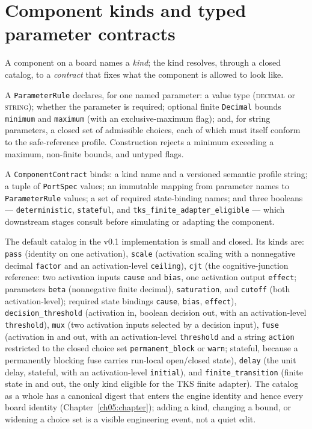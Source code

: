 \section{Component kinds and typed parameter contracts}
\label{ch04:sec:contracts}

A component on a board names a \emph{kind}; the kind resolves, through a
closed catalog, to a \emph{contract} that fixes what the component is
allowed to look like.

\begin{definition}\label{ch04:def:paramrule}
A \texttt{ParameterRule} declares, for one named parameter: a value type
(\textsc{decimal} or \textsc{string}); whether the parameter is required;
optional finite \texttt{Decimal} bounds \texttt{minimum} and
\texttt{maximum} (with an exclusive-maximum flag); and, for string
parameters, a closed set of admissible choices, each of which must itself
conform to the safe-reference profile. Construction rejects a minimum
exceeding a maximum, non-finite bounds, and untyped flags.
\end{definition}

\begin{definition}\label{ch04:def:contract}
A \texttt{ComponentContract} binds: a kind name and a versioned semantic
profile string; a tuple of \texttt{PortSpec} values; an immutable mapping
from parameter names to \texttt{ParameterRule} values; a set of required
state-binding names; and three booleans --- \texttt{deterministic},
\texttt{stateful}, and \texttt{tks\_finite\_adapter\_eligible} --- which
downstream stages consult before simulating or adapting the component.
\end{definition}

The default catalog in the v0.1 implementation is small and closed. Its
kinds are: \texttt{pass} (identity on one activation), \texttt{scale}
(activation scaling with a nonnegative decimal \texttt{factor} and an
activation-level \texttt{ceiling}), \texttt{cjt} (the cognitive-junction
reference: two activation inputs \texttt{cause} and \texttt{bias}, one
activation output \texttt{effect}; parameters \texttt{beta} (nonnegative
finite decimal), \texttt{saturation}, and \texttt{cutoff} (both
activation-level); required state bindings \texttt{cause},
\texttt{bias}, \texttt{effect}), \texttt{decision\_threshold}
(activation in, boolean decision out, with an activation-level
\texttt{threshold}), \texttt{mux} (two activation inputs selected by a
decision input), \texttt{fuse} (activation in and out, with an
activation-level \texttt{threshold} and a string \texttt{action}
restricted to the closed choice set \texttt{permanent\_block} or
\texttt{warn}; stateful, because a permanently blocking fuse carries
run-local open/closed state), \texttt{delay} (the unit delay, stateful,
with an activation-level \texttt{initial}), and \texttt{finite\_transition}
(finite state in and out, the only kind eligible for the TKS finite
adapter). The catalog as a whole has a canonical digest that enters the
engine identity and hence every board identity
(Chapter~\ref{ch05:chapter}); adding a kind, changing a bound, or widening
a choice set is a visible engineering event, not a quiet edit.

